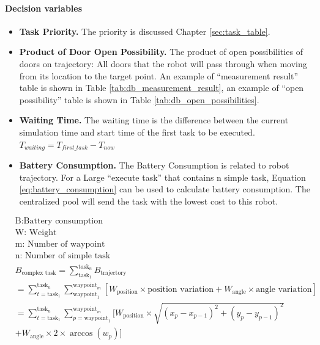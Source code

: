 \paragraph{Decision variables}
\begin{itemize}
\item \textbf{Task Priority.}  The priority is discussed Chapter \ref{sec:task_table}.
\item \textbf{Product of Door Open Possibility.} The product of open possibilities of doors on trajectory: All doors that the robot will pass through when moving from its location to the target point.
	An example of ``measurement result'' table is shown in Table \ref{tab:db_measurement_result}, an example of ``open possibility'' table is shown in Table \ref{tab:db_open_possibilities}. 
\item \textbf{Waiting Time. } The waiting time is the difference between the current simulation time and start time of the first task to be executed. $T_{waiting} = T_{first\_task} - T_{now}$
\item \textbf{Battery Consumption.} The Battery Consumption is related to robot trajectory. For a Large ``execute task'' that contains n simple task, Equation \ref{eq:battery_consumption} can be used to calculate battery consumption. The centralized pool will send the task with the lowest cost to this robot.
\end{itemize}


\begin{equation}
\begin{aligned}
\label{eq:battery_consumption}
& \mbox{B:Battery consumption } \\
& \mbox{W: Weight } \\
& \mbox{m: Number of waypoint } \\
& \mbox{n: Number of simple task} \\
& B_{\mbox{complex task}} = \sum_{\mbox{task}_1}^{\mbox{task}_n} B_{\mbox{trajectory}} \\
& = \sum_{t = \mbox{task}_1}^{\mbox{task}_n} \sum_{\mbox{waypoint}_1}^{\mbox{waypoint}_m} [W_{\mbox{position}} \times \mbox{position variation}+W_{\mbox{angle}}  \times \mbox{angle variation}]\\
& = \sum_{t = \mbox{task}_1}^{\mbox{task}_n} \sum_{p = \mbox{waypoint}_1}^{\mbox{waypoint}_m} [ W_{\mbox{position}} \times \sqrt{(x_p-x_{p-1} )^2+(y_p-y_{p-1} )^2} \\
&   + W_{\mbox{angle}} \times 2 \times \arccos(w_p)] 
\end{aligned}
\end{equation}


